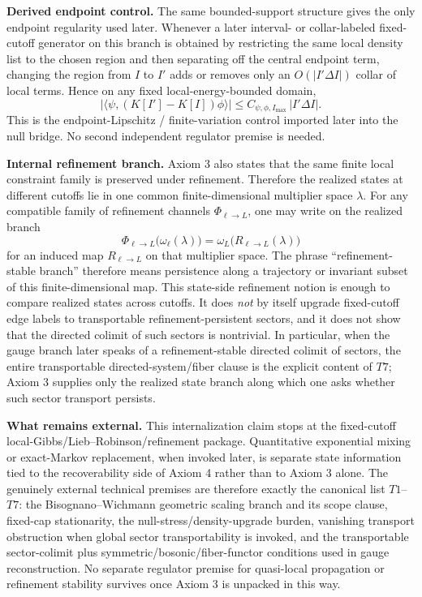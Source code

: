\textbf{Derived endpoint control.} The same bounded-support structure gives the only endpoint regularity used later. Whenever a later interval- or collar-labeled fixed-cutoff generator on this branch is obtained by restricting the same local density list to the chosen region and then separating off the central endpoint term, changing the region from \(I\) to \(I'\) adds or removes only an \(O(|I'\Delta I|)\) collar of local terms. Hence on any fixed local-energy-bounded domain,
\[
\left|\langle\psi,(K[I']-K[I])\phi\rangle\right|
\le
C_{\psi,\phi,I_{\max}}\,|I'\Delta I|.
\]
This is the endpoint-Lipschitz / finite-variation control imported later into the null bridge. No second independent regulator premise is needed.

\textbf{Internal refinement branch.} Axiom 3 also states that the same finite local constraint family is preserved under refinement. Therefore the realized states at different cutoffs lie in one common finite-dimensional multiplier space \(\lambda\). For any compatible family of refinement channels \(\Phi_{\ell\to L}\), one may write on the realized branch
\[
\Phi_{\ell\to L}\bigl(\omega_\ell(\lambda)\bigr)
=
\omega_L\!\bigl(R_{\ell\to L}(\lambda)\bigr)
\]
for an induced map \(R_{\ell\to L}\) on that multiplier space. The phrase ``refinement-stable branch'' therefore means persistence along a trajectory or invariant subset of this finite-dimensional map. This state-side refinement notion is enough to compare realized states across cutoffs. It does \emph{not} by itself upgrade fixed-cutoff edge labels to transportable refinement-persistent sectors, and it does not show that the directed colimit of such sectors is nontrivial. In particular, when the gauge branch later speaks of a refinement-stable directed colimit of sectors, the entire transportable directed-system/fiber clause is the explicit content of \(T7\); Axiom 3 supplies only the realized state branch along which one asks whether such sector transport persists.

\textbf{What remains external.} This internalization claim stops at the fixed-cutoff local-Gibbs/Lieb--Robinson/refinement package. Quantitative exponential mixing or exact-Markov replacement, when invoked later, is separate state information tied to the recoverability side of Axiom 4 rather than to Axiom 3 alone. The genuinely external technical premises are therefore exactly the canonical list \(T1\)--\(T7\): the Bisognano--Wichmann geometric scaling branch and its scope clause, fixed-cap stationarity, the null-stress/density-upgrade burden, vanishing transport obstruction when global sector transportability is invoked, and the transportable sector-colimit plus symmetric/bosonic/fiber-functor conditions used in gauge reconstruction. No separate regulator premise for quasi-local propagation or refinement stability survives once Axiom 3 is unpacked in this way.

